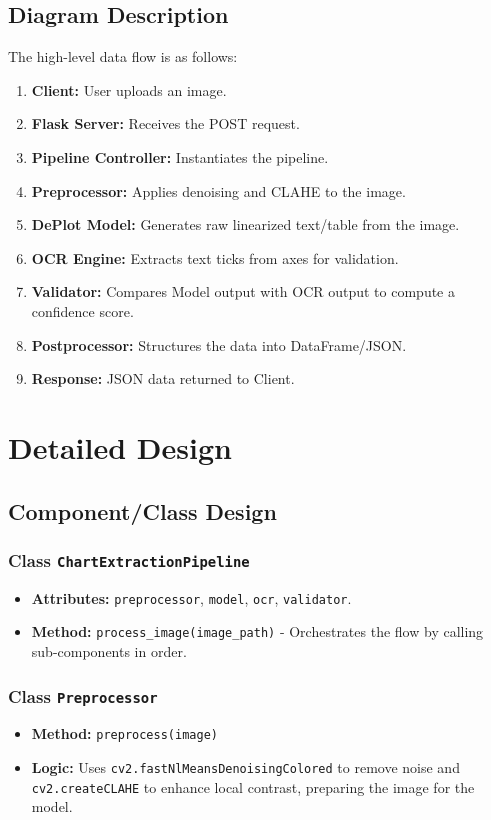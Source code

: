 \documentclass[12pt, a4paper]{article}
\begin{document}
\subsection{Diagram Description}
The high-level data flow is as follows:
\begin{enumerate}
    \item \textbf{Client:} User uploads an image.
    \item \textbf{Flask Server:} Receives the POST request.
    \item \textbf{Pipeline Controller:} Instantiates the pipeline.
    \item \textbf{Preprocessor:} Applies denoising and CLAHE to the image.
    \item \textbf{DePlot Model:} Generates raw linearized text/table from the image.
    \item \textbf{OCR Engine:} Extracts text ticks from axes for validation.
    \item \textbf{Validator:} Compares Model output with OCR output to compute a confidence score.
    \item \textbf{Postprocessor:} Structures the data into DataFrame/JSON.
    \item \textbf{Response:} JSON data returned to Client.
\end{enumerate}

\section{Detailed Design}

\subsection{Component/Class Design}

\subsubsection{Class \texttt{ChartExtractionPipeline}}
\begin{itemize}
    \item \textbf{Attributes:} \texttt{preprocessor}, \texttt{model}, \texttt{ocr}, \texttt{validator}.
    \item \textbf{Method:} \texttt{process\_image(image\_path)} - Orchestrates the flow by calling sub-components in order.
\end{itemize}

\subsubsection{Class \texttt{Preprocessor}}
\begin{itemize}
    \item \textbf{Method:} \texttt{preprocess(image)}
    \item \textbf{Logic:} Uses \texttt{cv2.fastNlMeansDenoisingColored} to remove noise and \texttt{cv2.createCLAHE} to enhance local contrast, preparing the image for the model.
\end{itemize}
\end{document}
